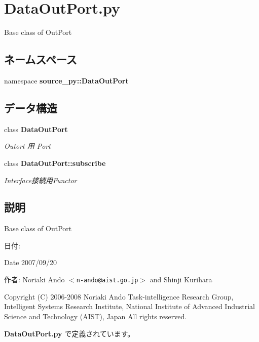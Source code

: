 \section{DataOutPort.py}
\label{_data_out_port_8py}
Base class of OutPort 

\subsection*{ネームスペース}
\begin{CompactItemize}
\item 
namespace \textbf{source\_\-py::DataOutPort}
\end{CompactItemize}
\subsection*{データ構造}
\begin{CompactItemize}
\item 
class {\bf DataOutPort}
\begin{CompactList}\small\item\em Outort 用 Port \item\end{CompactList}\item 
class {\bf DataOutPort::subscribe}
\begin{CompactList}\small\item\em Interface接続用Functor \item\end{CompactList}\end{CompactItemize}


\subsection{説明}
Base class of OutPort 

\begin{Desc}
\item[日付:]\end{Desc}
\begin{Desc}
\item[Date]2007/09/20 \end{Desc}
\begin{Desc}
\item[作者:]Noriaki Ando $<${\tt n-ando@aist.go.jp}$>$ and Shinji Kurihara\end{Desc}
Copyright (C) 2006-2008 Noriaki Ando Task-intelligence Research Group, Intelligent Systems Research Institute, National Institute of Advanced Industrial Science and Technology (AIST), Japan All rights reserved. 

 {\bf DataOutPort.py} で定義されています。